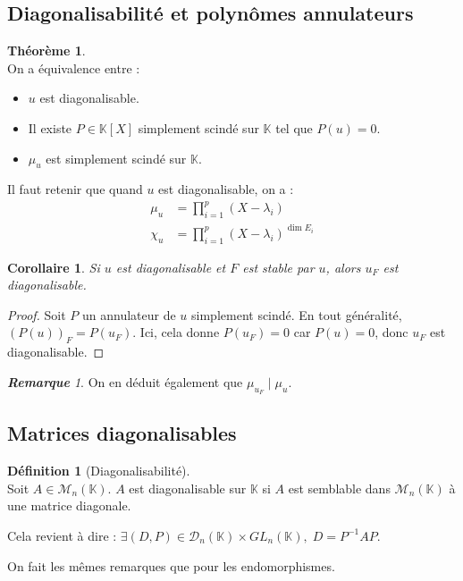 \documentclass[12pt]{book}
\let\ensembleNombre\mathbb
\newcommand*\K{\ensuremath{\ensembleNombre{K}}}
\newtheorem*{cor}{Corollaire}
\theoremstyle{definition}
\newtheorem*{defi}{Définition}
\newtheorem{thme}{Théorème}[chapter]
\theoremstyle{remark}
\newtheorem*{rem}{\textbf{Remarque}}
\newenvironment{fdef}
  {\begin{mdframed}[roundcorner=10pt, linewidth=1pt]\begin{defi}}
  {\end{defi}\end{mdframed}}
\newenvironment{fthme}
  {\begin{mdframed}[roundcorner=10pt, linewidth=2pt]\begin{thme}}
  {\end{thme}\end{mdframed}}
\begin{document}
	\subsection{Diagonalisabilité et polynômes annulateurs}
	\begin{fthme}\mbox{~}\\
	On a équivalence entre :
	\begin{itemize}
	\item[1)] $u$ est diagonalisable.
	\item[2)] Il existe $P \in \K[X]$ simplement scindé sur $\K$ tel que $P(u) = 0$.
	\item[3)] $\mu_u$ est simplement scindé sur $\K$.
	\end{itemize}
	\end{fthme}
	
	Il faut retenir que quand $u$ est diagonalisable, on a :
	\begin{align*}
	\mu_u &= \prod_{i=1}^p (X - \lambda_i) \\
	\chi_u &= \prod_{i=1}^p (X - \lambda_i)^{\dim E_i}
	\end{align*}
	
	\begin{cor}
	Si $u$ est diagonalisable et $F$ est stable par $u$, alors $u_F$ est diagonalisable.
	\end{cor}
	\begin{proof}
	Soit $P$ un annulateur de $u$ simplement scindé. En tout généralité, $(P(u))_F = P(u_F)$. Ici, cela donne $P(u_F)=0$ car $P(u) = 0$, donc $u_F$ est diagonalisable.
	\end{proof}
	
	\begin{rem}
	On en déduit également que $\mu_{u_F} \;|\; \mu_u$.
	\end{rem}
	
	\subsection{Matrices diagonalisables}
	\begin{fdef}[Diagonalisabilité]\mbox{~}\\
	Soit $A \in \mathcal M_n(\K)$. $A$ est diagonalisable sur $\K$ si $A$ est semblable dans $\mathcal M_n(\K)$ à une matrice diagonale.
	
	Cela revient à dire : $\exists (D,P) \in \mathcal D_n(\K) \times GL_n(\K),\; D = P^{-1}AP$.
	\end{fdef}
	
	On fait les mêmes remarques que pour les endomorphismes.
	
\end{document}
